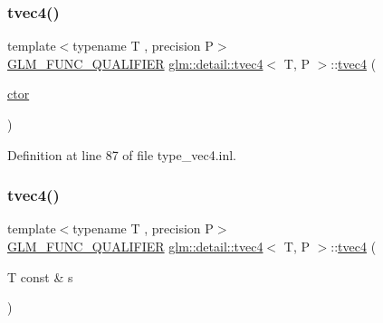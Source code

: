 \mbox{\label{structglm_1_1detail_1_1tvec4_a76288c36dfc019fc431f373a0deb120a}} 
\subsubsection{\texorpdfstring{tvec4()}{tvec4()}\hspace{0.1cm}{\footnotesize\ttfamily [4/23]}}
{\footnotesize\ttfamily template$<$typename T , precision P$>$ \\
\hyperlink{setup_8hpp_a33fdea6f91c5f834105f7415e2a64407}{G\+L\+M\+\_\+\+F\+U\+N\+C\+\_\+\+Q\+U\+A\+L\+I\+F\+I\+ER} \hyperlink{structglm_1_1detail_1_1tvec4}{glm\+::detail\+::tvec4}$<$ T, P $>$\+::\hyperlink{structglm_1_1detail_1_1tvec4}{tvec4} (\begin{DoxyParamCaption}\item[{\hyperlink{structglm_1_1detail_1_1tvec4_a931ed25f812335023097a513240ae102}{ctor}}]{ }\end{DoxyParamCaption})\hspace{0.3cm}{\ttfamily [explicit]}}



Definition at line 87 of file type\+\_\+vec4.\+inl.

\mbox{\label{structglm_1_1detail_1_1tvec4_af4c65b47ca8e04cb84fc7daf5f30d7ad}} 
\subsubsection{\texorpdfstring{tvec4()}{tvec4()}\hspace{0.1cm}{\footnotesize\ttfamily [5/23]}}
{\footnotesize\ttfamily template$<$typename T , precision P$>$ \\
\hyperlink{setup_8hpp_a33fdea6f91c5f834105f7415e2a64407}{G\+L\+M\+\_\+\+F\+U\+N\+C\+\_\+\+Q\+U\+A\+L\+I\+F\+I\+ER} \hyperlink{structglm_1_1detail_1_1tvec4}{glm\+::detail\+::tvec4}$<$ T, P $>$\+::\hyperlink{structglm_1_1detail_1_1tvec4}{tvec4} (\begin{DoxyParamCaption}\item[{T const \&}]{s }\end{DoxyParamCaption})\hspace{0.3cm}{\ttfamily [explicit]}}




